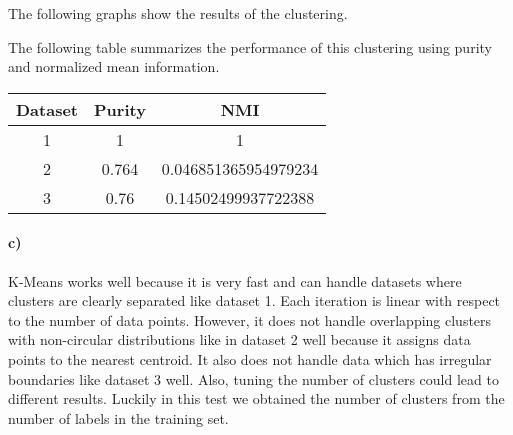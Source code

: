 \documentclass[12pt]{article}
\begin{document}
The following graphs show the results of the clustering.
\begin{center}
\end{center}
The following table summarizes the performance of this clustering using purity and normalized mean information.
\begin{center}
    \begin{tabular}{c|c|c}
        Dataset & Purity & NMI\\
        \hline
        1 & 1 & 1\\
        2 & 0.764 & 0.046851365954979234\\
        3 & 0.76 & 0.14502499937722388\\
    \end{tabular}
\end{center}

\paragraph{c)}

K-Means works well because it is very fast and can handle datasets where clusters are clearly separated like dataset 1. Each iteration
is linear with respect to the number of data points. However, it does not handle overlapping clusters with non-circular distributions
like in dataset 2 well because it assigns data points to the nearest centroid. It also does not handle data which has irregular
boundaries like dataset 3 well. Also, tuning the number of clusters could lead to different results.
Luckily in this test we obtained the number of clusters from the number of labels in the training set.
\end{document}
